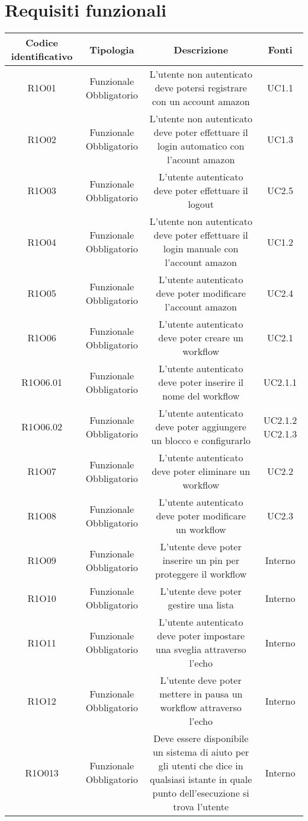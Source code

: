 \section{Requisiti funzionali}
\begin{tabularx}{\textwidth}{|C|C|C|C|}
	\hline
     \textbf{Codice identificativo} & \textbf{Tipologia} & \textbf{Descrizione} & \textbf{Fonti} \\
    \hline
	\endhead
	R1O01& Funzionale Obbligatorio &L'utente non autenticato deve potersi registrare con un account amazon& UC1.1	\\
	\hline
	R1O02& Funzionale Obbligatorio &L'utente non autenticato deve poter effettuare il login automatico con l'acount amazon  & UC1.3\\
	\hline
	R1O03& Funzionale Obbligatorio &L'utente autenticato deve poter effettuare il logout & UC2.5\\
	\hline
	R1O04& Funzionale Obbligatorio &L'utente non autenticato deve poter effettuare il login manuale con l'account amazon& UC1.2\\
	\hline
	R1O05& Funzionale Obbligatorio&L'utente autenticato deve poter modificare l'account amazon& UC2.4\\
	\hline
	R1O06&Funzionale Obbligatorio &L'utente autenticato deve poter creare un workflow& UC2.1\\
	\hline
	R1O06.01&Funzionale Obbligatorio& L'utente autenticato deve poter inserire il nome del workflow  & UC2.1.1\\
	\hline
	R1O06.02&Funzionale Obbligatorio&L'utente autenticato deve poter aggiungere un blocco e configurarlo  &UC2.1.2 UC2.1.3\\
	\hline
	R1O07&Funzionale Obbligatorio& L'utente autenticato deve poter eliminare un workflow  &UC2.2\\
	\hline
	R1O08&Funzionale Obbligatorio &L'utente autenticato deve poter modificare un workflow&UC2.3\\
	\hline
	R1O09& Funzionale Obbligatorio&L'utente deve poter inserire un pin per proteggere il workflow & Interno \\
	\hline
	R1O10&Funzionale Obbligatorio & L'utente deve poter gestire una lista& Interno\\
	\hline
	R1O11&Funzionale Obbligatorio  &L'utente autenticato deve poter impostare una sveglia attraverso l'echo &Interno\\
	\hline
	R1O12&Funzionale Obbligatorio  &L'utente deve poter mettere in pausa un workflow attraverso l'echo&Interno \\
	\hline
	R1O013&Funzionale Obbligatorio&Deve essere disponibile un sistema di aiuto per gli utenti che dice in qualsiasi istante in quale punto dell'esecuzione si trova l'utente& Interno\\
	\hline
\end{tabularx}


